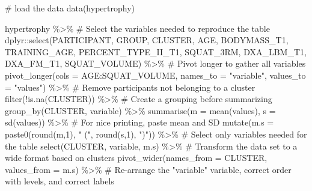\documentclass[
  11pt,
  letterpaper,
]{scrbook}
\newenvironment{Shaded}{\begin{snugshade}}{\end{snugshade}}
\newcommand{\AttributeTok}[1]{\textcolor[rgb]{0.40,0.45,0.13}{#1}}
\newcommand{\CommentTok}[1]{\textcolor[rgb]{0.37,0.37,0.37}{#1}}
\newcommand{\DecValTok}[1]{\textcolor[rgb]{0.68,0.00,0.00}{#1}}
\newcommand{\FunctionTok}[1]{\textcolor[rgb]{0.28,0.35,0.67}{#1}}
\newcommand{\NormalTok}[1]{\textcolor[rgb]{0.00,0.23,0.31}{#1}}
\newcommand{\SpecialCharTok}[1]{\textcolor[rgb]{0.37,0.37,0.37}{#1}}
\newcommand{\StringTok}[1]{\textcolor[rgb]{0.13,0.47,0.30}{#1}}
\begin{document}
\hypertarget{toggleText1}{}
\begin{Shaded}
\begin{Highlighting}[numbers=left,,]
\CommentTok{\# load the data}
\FunctionTok{data}\NormalTok{(hypertrophy)}


\NormalTok{hypertrophy }\SpecialCharTok{\%\textgreater{}\%}
\CommentTok{\# Select the variables needed to reproduce the table}
\NormalTok{  dplyr}\SpecialCharTok{::}\FunctionTok{select}\NormalTok{(PARTICIPANT, }
\NormalTok{                GROUP, }
\NormalTok{                CLUSTER,}
\NormalTok{                AGE, }
\NormalTok{                BODYMASS\_T1, }
\NormalTok{                TRAINING\_AGE,}
\NormalTok{                PERCENT\_TYPE\_II\_T1, }
\NormalTok{                SQUAT\_3RM, }
\NormalTok{                DXA\_LBM\_T1,}
\NormalTok{                DXA\_FM\_T1, }
\NormalTok{                SQUAT\_VOLUME) }\SpecialCharTok{\%\textgreater{}\%}
  \CommentTok{\# Pivot longer to gather all variables}
  \FunctionTok{pivot\_longer}\NormalTok{(}\AttributeTok{cols =}\NormalTok{ AGE}\SpecialCharTok{:}\NormalTok{SQUAT\_VOLUME, }\AttributeTok{names\_to =} \StringTok{"variable"}\NormalTok{, }\AttributeTok{values\_to =} \StringTok{"values"}\NormalTok{) }\SpecialCharTok{\%\textgreater{}\%}
  \CommentTok{\# Remove participants not belonging to a cluster}
  \FunctionTok{filter}\NormalTok{(}\SpecialCharTok{!}\FunctionTok{is.na}\NormalTok{(CLUSTER)) }\SpecialCharTok{\%\textgreater{}\%}
  \CommentTok{\# Create a grouping before summarizing}
  \FunctionTok{group\_by}\NormalTok{(CLUSTER, variable) }\SpecialCharTok{\%\textgreater{}\%}
  \FunctionTok{summarise}\NormalTok{(}\AttributeTok{m =} \FunctionTok{mean}\NormalTok{(values), }
            \AttributeTok{s =} \FunctionTok{sd}\NormalTok{(values)) }\SpecialCharTok{\%\textgreater{}\%}
  \CommentTok{\# For nice printing, paste mean and SD }
  \FunctionTok{mutate}\NormalTok{(}\AttributeTok{m.s =} \FunctionTok{paste0}\NormalTok{(}\FunctionTok{round}\NormalTok{(m,}\DecValTok{1}\NormalTok{), }\StringTok{" ("}\NormalTok{, }\FunctionTok{round}\NormalTok{(s,}\DecValTok{1}\NormalTok{), }\StringTok{")"}\NormalTok{)) }\SpecialCharTok{\%\textgreater{}\%}
  \CommentTok{\# Select only variables needed for the table}
  \FunctionTok{select}\NormalTok{(CLUSTER, variable, m.s) }\SpecialCharTok{\%\textgreater{}\%}
  \CommentTok{\# Transform the data set to a wide format based on clusters}
  \FunctionTok{pivot\_wider}\NormalTok{(}\AttributeTok{names\_from =}\NormalTok{ CLUSTER, }\AttributeTok{values\_from =}\NormalTok{ m.s) }\SpecialCharTok{\%\textgreater{}\%}
  \CommentTok{\# Re{-}arrange the "variable" variable, correct order with levels, and correct labels}

\end{Highlighting}
\end{Shaded}
\end{document}
